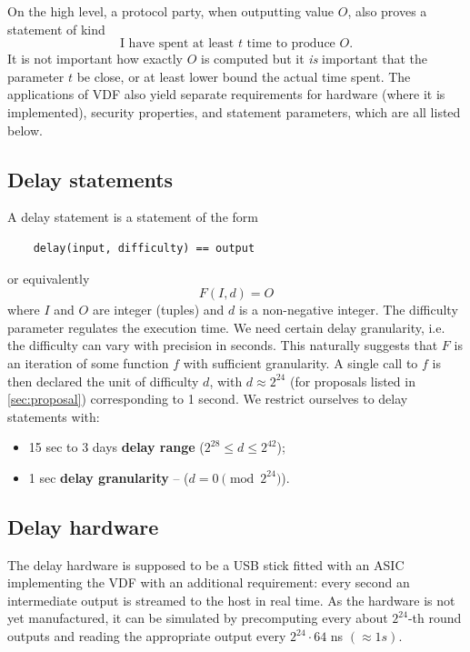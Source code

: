 \documentclass{article}
\begin{document}
On the high level, a protocol party, when outputting value $O$, also proves a statement of kind
$$
\text{I have spent at least $t$ time to produce }O.
$$
It is not important how exactly $O$ is computed but it \emph{is} important that the parameter $t$ be close, or at least  lower bound the actual time spent. The applications of VDF also yield separate requirements for hardware (where it is implemented), security properties, and statement parameters, which are all listed below.

\subsection{ Delay statements}

A delay statement is a statement of the form \begin{verbatim}
    delay(input, difficulty) == output
\end{verbatim} or equivalently
$$
F(I,d) = O
$$
where $I$ and $O$  are  integer (tuples)  and $d$  is a non-negative integer. The difficulty parameter regulates the execution time. We need certain delay granularity, i.e. the difficulty can vary with precision in seconds. This naturally suggests that $F$ is an iteration of some function $f$ with sufficient granularity. A single call to $f$ is then declared the unit of difficulty $d$, with $d\approx 2^{24}$ (for proposals listed in \cref{sec:proposal}) corresponding to 1 second. We restrict ourselves to delay statements with:
\begin{itemize}
    \item 15 sec to 3 days \textbf{delay range} ($2^{28}\leq d\leq 2^{42}$);
    \item  1 sec \textbf{delay granularity} --  ($d =0 \pmod{ 2^{24}}$).
\end{itemize}

\subsection{ Delay hardware}

The delay hardware is supposed to be a USB stick fitted with an ASIC implementing the VDF with  an additional requirement: every second an intermediate output   is streamed to the host in real time. As the  hardware is not yet manufactured, it can   be simulated by precomputing every about $2^{24}$-th round outputs and reading the appropriate output every $2^{24}\cdot 64$ ns $(\approx 1s)$.
\end{document}
